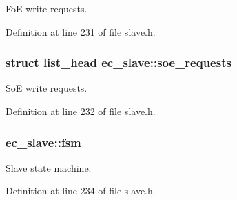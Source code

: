 Fo\-E write requests. 



Definition at line 231 of file slave.\-h.

\subsubsection[{soe\-\_\-requests}]{\setlength{\rightskip}{0pt plus 5cm}struct list\-\_\-head ec\-\_\-slave\-::soe\-\_\-requests}\label{structec__slave_a85daad41c4862aa0de137a3c927abac8}


So\-E write requests. 



Definition at line 232 of file slave.\-h.

\subsubsection[{fsm}]{ ec\-\_\-slave\-::fsm}\label{structec__slave_aecb677b730d579c8eeeaa83a432a74a8}


Slave state machine. 



Definition at line 234 of file slave.\-h.

